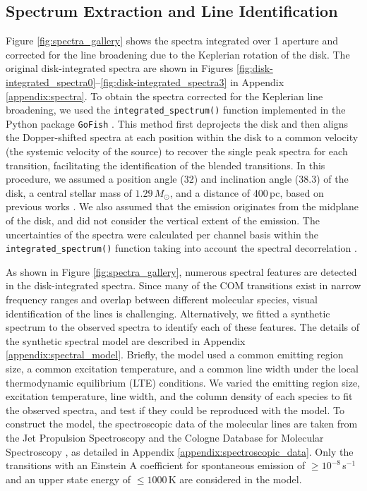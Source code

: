\documentclass[twocolumn, twocolappendix, astrosymb, times]{aastex631}
\begin{document}
\subsection{Spectrum Extraction and Line Identification}\label{subsec:line_identification}
Figure \ref{fig:spectra_gallery} shows the spectra integrated over 1 aperture and corrected for the line broadening due to the Keplerian rotation of the disk. The original disk-integrated spectra are shown in Figures \ref{fig:disk-integrated_spectra0}--\ref{fig:disk-integrated_spectra3} in Appendix \ref{appendix:spectra}. To obtain the spectra corrected for the Keplerian line broadening, we used the \texttt{integrated\_spectrum()} function implemented in the Python package \texttt{GoFish} \citep{GoFish}. This method first deprojects the disk and then aligns the Dopper-shifted spectra at each position within the disk to a common velocity (the systemic velocity of the source) to recover the single peak spectra for each transition, facilitating the identification of the blended transitions. In this procedure, we assumed a position angle (32\arcdeg) and inclination angle (38.3\arcdeg) of the disk, a central stellar mass of $1.29\,M_\odot$, and a distance of 400\,pc, based on previous works \citep{Cieza2016, Tobin2023}. We also assumed that the emission originates from the midplane of the disk, and did not consider the vertical extent of the emission. The uncertainties of the spectra were calculated per channel basis within the \texttt{integrated\_spectrum()} function taking into account the spectral decorrelation \citep{Yen2016}.

As shown in Figure \ref{fig:spectra_gallery}, numerous spectral features are detected in the disk-integrated spectra. Since many of the COM transitions exist in narrow frequency ranges and overlap between different molecular species, visual identification of the lines is challenging. Alternatively, we fitted a synthetic spectrum to the observed spectra to identify each of these features. The details of the synthetic spectral model are described in Appendix \ref{appendix:spectral_model}. Briefly, the model used a common emitting region size, a common excitation temperature, and a common line width under the local thermodynamic equilibrium (LTE) conditions. We varied the emitting region size, excitation temperature, line width, and the column density of each species to fit the observed spectra, and test if they could be reproduced with the model. To construct the model, the spectroscopic data of the molecular lines are taken from the Jet Propulsion Spectroscopy \citep[JPL;][]{JPL} and the Cologne Database for Molecular Spectroscopy \citep[CDMS;][]{CDMS1, CDMS2, CDMS3}, as detailed in Appendix \ref{appendix:spectroscopic_data}. Only the transitions with an Einstein A coefficient for spontaneous emission of $\geq10^{-8}$\,s$^{-1}$ and an upper state energy of $\leq1000$\,K are considered in the model.
\end{document}
